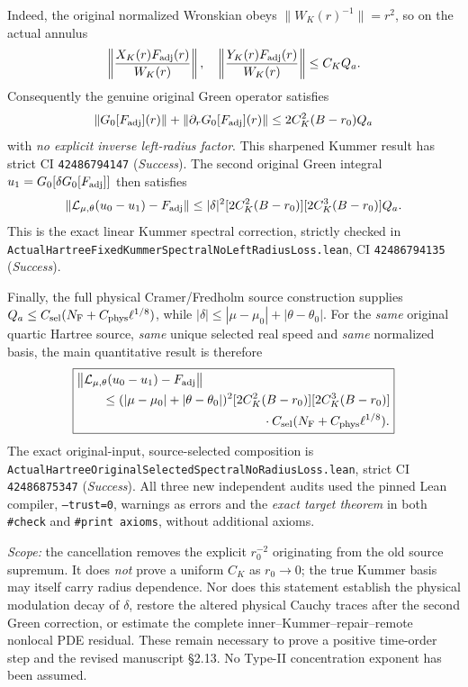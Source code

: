 \documentclass[11pt]{amsart}
\begin{document}
Indeed, the original normalized Wronskian obeys
\(\|W_K(r)^{-1}\|=r^2\), so on the actual annulus
\[
 \left\|\frac{X_K(r)F_{\rm adj}(r)}{W_K(r)}\right\|,
 \quad
 \left\|\frac{Y_K(r)F_{\rm adj}(r)}{W_K(r)}\right\|
 \le C_KQ_a.
\]
Consequently the genuine original Green operator satisfies
\[
 \|G_0[F_{\rm adj}](r)\|+
 \|\partial_rG_0[F_{\rm adj}](r)\|
 \le 2C_K^2(B-r_0)Q_a
\]
with \emph{no explicit inverse left-radius factor}.
This sharpened Kummer result has strict CI
\texttt{42486794147} (\emph{Success}).
The second original Green integral
\(u_1=G_0[\delta G_0[F_{\rm adj}]]\)
then satisfies
\[
 \|\mathcal L_{\mu,\theta}(u_0-u_1)-F_{\rm adj}\|
 \le |\delta|^2
 [2C_K^2(B-r_0)][2C_K^3(B-r_0)]Q_a.
\]
This is the exact linear Kummer spectral correction,
strictly checked in
\texttt{ActualHartreeFixedKummerSpectralNoLeftRadiusLoss.lean},
CI \texttt{42486794135} (\emph{Success}).

Finally, the full physical Cramer/Fredholm source construction
supplies \(Q_a\le C_{\rm sel}(N_{\rm F}
+C_{\rm phys}\ell^{1/8})\), while
\(|\delta|\le|\mu-\mu_0|+|\theta-\theta_0|\).
For the \emph{same} original quartic Hartree source,
\emph{same} unique selected real speed and \emph{same}
normalized basis, the main quantitative result is therefore
\[
 \boxed{\begin{aligned}
 &\bigl\|\mathcal L_{\mu,\theta}(u_0-u_1)
             -F_{\rm adj}\bigr\|\\
 &\qquad\le
 (|\mu-\mu_0|+|\theta-\theta_0|)^2
 [2C_K^2(B-r_0)][2C_K^3(B-r_0)]\\
 &\hspace{52mm}\cdot C_{\rm sel}
 (N_{\rm F}+C_{\rm phys}\ell^{1/8}).
 \end{aligned}}
\]
The exact original-input, source-selected composition is
\texttt{ActualHartreeOriginalSelectedSpectralNoRadiusLoss.lean},
strict CI \texttt{42486875347} (\emph{Success}).
All three new independent audits used the pinned Lean compiler,
\texttt{--trust=0}, warnings as errors and the
\emph{exact target theorem} in both \texttt{\#check}
and \texttt{\#print axioms}, without additional axioms.

\emph{Scope:} the cancellation removes the explicit
\(r_0^{-2}\) originating from the old source supremum.
It does \emph{not} prove a uniform \(C_K\) as \(r_0\to0\);
the true Kummer basis may itself carry radius dependence.
Nor does this statement establish the physical modulation
decay of \(\delta\), restore the altered physical Cauchy
traces after the second Green correction, or estimate
the complete inner--Kummer--repair--remote nonlocal PDE
residual. These remain necessary to prove a positive
time-order step and the revised manuscript §2.13.
No Type-II concentration exponent has been assumed.
\end{document}
